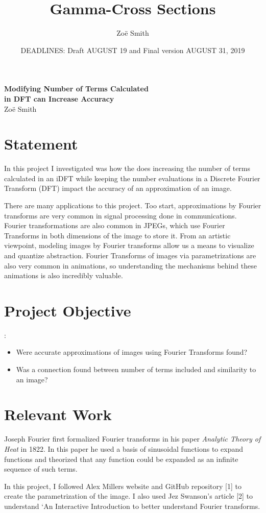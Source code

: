 \documentclass[psamsfonts]{amsart}
\title{Gamma-Cross Sections}
\author{Zo\"e Smith}
\date{DEADLINES: Draft AUGUST 19 and Final version AUGUST 31, 2019}
\theoremstyle{definition}
\theoremstyle{remark}
\numberwithin{equation}{section}
\begin{document}
\begin{center}
	{\bfseries Modifying Number of Terms Calculated \\in DFT can Increase Accuracy}\\
	Zo\"e Smith
\end{center}

 \section{Statement}
 In this project I investigated was how the does increasing the number of terms calculated in an iDFT while keeping the number evaluations in a Discrete Fourier Transform (DFT) impact the accuracy of an approximation of an image. 
 
 There are many applications to this project. Too start, approximations by Fourier transforms are very common in signal processing done in communications. Fourier transformations are also common in JPEGs, which use Fourier Transforms in both dimensions of the image to store it. From an artistic viewpoint, modeling images by Fourier transforms allow us a means to visualize and quantize abstraction. Fourier Transforms of images via parametrizations are also very common in animations, so understanding the mechanisms behind these animations is also incredibly valuable. 
 \section{Project Objective}:
 \begin{itemize}
 	\item Were accurate approximations of images using Fourier Transforms found?
 	\item Was a connection found between number of terms included and similarity to an image?
 \end{itemize}
 
 \section{Relevant Work}
 Joseph Fourier first formalized Fourier transforms in his paper \textit{Analytic Theory of Heat} in 1822. In this paper he used a basis of sinusoidal functions to expand functions and theorized that any function could be expanded as an infinite sequence of such terms. 
 
 In this project, I followed Alex Millers website and GitHub repository [1] to create the parametrization of the image. I also used Jez Swanson's article [2] to understand `An Interactive Introduction to better understand Fourier transforms.
 
\end{document}
